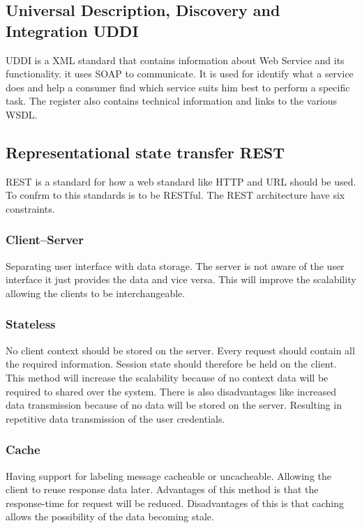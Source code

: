 \documentclass{llncs}
\begin{document}
\subsection{Universal Description, Discovery and Integration UDDI}
UDDI is a XML standard that contains information about Web Service and its functionality. it uses SOAP to communicate. It is used for identify what a service does and help a consumer find which service suits him best to perform a specific task. The register also contains technical information and links to the various WSDL.

\subsection{Representational state transfer REST}
REST is a standard for how a web standard like HTTP and URL should be used. To confrm to this standards is to be RESTful. The REST architecture have six constraints.

\subsubsection{Client–Server}
Separating user interface with data storage. The server is not aware of the user interface it just provides the data and vice versa. This will improve the scalability allowing the clients to be interchangeable.

\subsubsection{Stateless}
No client context should be stored on the server. Every request should contain all the required information. Session state should therefore be held on the client. This method will increase the scalability because of no context data will be required to shared over the system. There is also disadvantages like increased data transmission because of no data will be stored on the server. Resulting in repetitive data transmission of the user credentials.

\subsubsection{Cache}
Having support for labeling message cacheable or uncacheable. Allowing the client  to reuse response data later. Advantages of this method is that the response-time for request will be reduced. Disadvantages of this is that caching allows the possibility of the data becoming stale.
\end{document}
